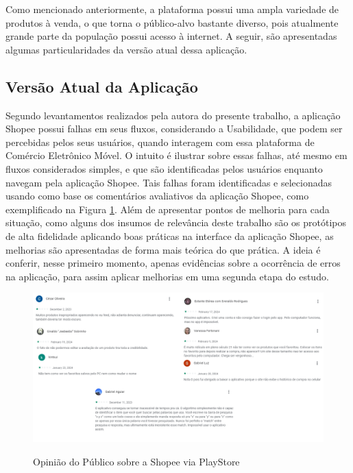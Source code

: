 Como mencionado anteriormente, a plataforma possui uma ampla variedade de produtos à venda, o que torna o público-alvo bastante diverso, pois atualmente grande parte da população possui acesso à internet. A seguir, são apresentadas algumas particularidades da versão atual dessa aplicação.

\subsection{Versão Atual da Aplicação}

Segundo levantamentos realizados pela autora do presente trabalho, a aplicação Shopee possui falhas em seus fluxos, considerando a Usabilidade, que podem ser percebidas pelos seus usuários, quando interagem com essa plataforma de Comércio Eletrônico Móvel. O intuito é ilustrar sobre essas falhas, até mesmo em fluxos considerados simples, e que são identificadas pelos usuários enquanto navegam pela aplicação Shopee. Tais falhas foram identificadas e selecionadas usando como base os comentários avaliativos da aplicação Shopee, como exemplificado na Figura \ref{s0}. Além de apresentar pontos de melhoria para cada situação, como alguns dos insumos de relevância deste trabalho são os protótipos de alta fidelidade aplicando boas práticas na interface da aplicação Shopee, as melhorias são apresentadas de forma mais teórica do que prática. A ideia é conferir, nesse primeiro momento, apenas evidências sobre a ocorrência de erros na aplicação, para assim aplicar melhorias em uma segunda etapa do estudo.

\begin{figure}[ht]
    \centering
    \caption{Opinião do Público sobre a Shopee via PlayStore}
    \includegraphics[keepaspectratio=true,scale=0.3]{figuras/cap05shopee.PNG}
    \label{s0}
\end{figure}

